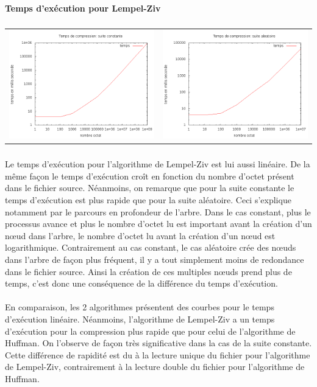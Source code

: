 \documentclass{report}
\begin{document}
\paragraph*{}
\textbf{Temps d’exécution pour Lempel-Ziv}
\subparagraph*{}
\hspace{-2cm}\begin{tabular}{l | l}
\includegraphics[width=7cm]{tempsClzC.png} & 
\includegraphics[width=7cm]{tempsClzA.png}
\end{tabular}

\subparagraph*{}
Le temps d'exécution pour l'algorithme de Lempel-Ziv est lui aussi linéaire. De la même façon le temps d'exécution croît en fonction du nombre d'octet présent dans le fichier source. Néanmoins, on remarque que pour la suite constante le temps d'exécution est plus rapide que pour la suite aléatoire. Ceci s'explique notamment par le parcours en profondeur de l'arbre. Dans le cas constant, plus le processus avance et plus le nombre d'octet lu est important avant la création d'un nœud dans l'arbre, le nombre d'octet lu avant la création d'un nœud est logarithmique. Contrairement au cas constant, le cas aléatoire crée des nœuds dans l'arbre de façon plus fréquent, il y a tout simplement moins de redondance dans le fichier source. Ainsi la création de ces multiples nœuds prend plus de temps, c'est donc une conséquence de la différence du temps d'exécution.

\paragraph*{}
En comparaison, les 2 algorithmes présentent des courbes pour le temps d'exécution linéaire. Néanmoins, l'algorithme de Lempel-Ziv a un temps d'exécution pour la compression plus rapide que pour celui de l'algorithme de Huffman. On l'observe de façon très significative dans la cas de la suite constante. Cette différence de rapidité est du à la lecture unique du fichier pour l'algorithme de Lempel-Ziv, contrairement à la lecture double du fichier pour l'algorithme de Huffman.	
\end{document}
